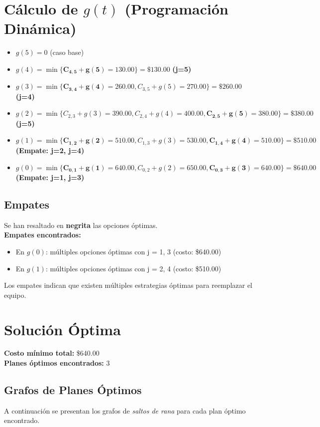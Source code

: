 \documentclass[12pt]{article}
\begin{document}
\clearpage
\section*{Cálculo de $g(t)$ (Programación Dinámica)}
\begin{itemize}
\item $g(5) = 0$ (caso base)
\item $g(4) = \min\{ \mathbf{C_{4,5} + g(5) = 130.00}\} = \$130.00$ \textbf{(j=5)}
\item $g(3) = \min\{ \mathbf{C_{3,4} + g(4) = 260.00}, C_{3,5} + g(5) = 270.00\} = \$260.00$ \textbf{(j=4)}
\item $g(2) = \min\{ C_{2,3} + g(3) = 390.00, C_{2,4} + g(4) = 400.00, \mathbf{C_{2,5} + g(5) = 380.00}\} = \$380.00$ \textbf{(j=5)}
\item $g(1) = \min\{ \mathbf{C_{1,2} + g(2) = 510.00}, C_{1,3} + g(3) = 530.00, \mathbf{C_{1,4} + g(4) = 510.00}\} = \$510.00$ \textbf{(Empate: j=2, j=4)}
\item $g(0) = \min\{ \mathbf{C_{0,1} + g(1) = 640.00}, C_{0,2} + g(2) = 650.00, \mathbf{C_{0,3} + g(3) = 640.00}\} = \$640.00$ \textbf{(Empate: j=1, j=3)}
\end{itemize}

\subsection*{Empates}
Se han resaltado en \textbf{negrita} las opciones óptimas.\\
\textbf{Empates encontrados:}
\begin{itemize}
\item En $g(0)$: múltiples opciones óptimas con j = 1, 3 (costo: \$640.00)
\item En $g(1)$: múltiples opciones óptimas con j = 2, 4 (costo: \$510.00)
\end{itemize}
Los empates indican que existen múltiples estrategias óptimas para reemplazar el equipo.\\
\clearpage
\section*{Solución Óptima}
\textbf{Costo mínimo total:} \$640.00\\
\textbf{Planes óptimos encontrados:} 3
\subsection*{Grafos de Planes Óptimos}
A continuación se presentan los grafos de \emph{saltos de rana} para cada plan óptimo encontrado.
\end{document}
